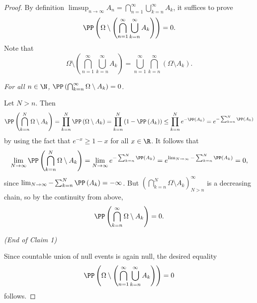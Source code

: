 \documentclass[stat901]{subfiles}
\begin{document}
    \begin{proof}
        By definition $\limsup_{n\to\infty}A_n = \bigcap^{\infty}_{n=1}\bigcup^{\infty}_{k=n}A_k$, it suffices to prove
        \begin{equation*}
            \PP\left( \Omega\setminus \left( \bigcap^{\infty}_{n=1}\bigcup^{\infty}_{k=n}A_k \right) \right) = 0.
        \end{equation*}
        Note that 
        \begin{equation*}
            \Omega\setminus \left( \bigcap^{\infty}_{n=1}\bigcup^{\infty}_{k=n}A_k \right) = \bigcup^{\infty}_{n=1}\bigcap^{\infty}_{k=n} \left( \Omega\setminus A_k \right).
        \end{equation*}

        \begin{claim}
            \textit{For all $n\in\N$, $\PP\left( \bigcap^{\infty}_{k=n} \Omega\setminus A_k \right) = 0$.}

            Let $N>n$. Then
            \begin{equation*}
                \PP\left( \bigcap^{N}_{k=n}\Omega\setminus A_k \right) = \prod^{N}_{k=n}\PP\left( \Omega\setminus A_k \right) = \prod^{N}_{k=n} \left( 1-\PP\left( A_k \right) \right) \leq \prod^{N}_{k=n} e^{-\PP\left( A_k \right)} = e^{-\sum^{N}_{k=n}\PP\left( A_k \right)}
            \end{equation*}
            by using the fact that $e^{-x}\geq 1-x$ for all $x\in\R$. It follows that
            \begin{equation*}
                \lim_{N\to\infty} \PP\left( \bigcap^{N}_{k=n} \Omega\setminus A_k \right) = \lim_{N\to\infty} e^{-\sum^{N}_{k=n}\PP\left( A_k \right)} = e^{\lim_{N\to\infty}-\sum^{N}_{k=n}\PP\left( A_k \right)} = 0,
            \end{equation*}
            since $\lim_{N\to\infty}-\sum^{N}_{k=n}\PP\left( A_k \right)=-\infty$. But $\left( \bigcap^{N}_{k=n}\Omega\setminus A_k \right)^{\infty}_{N>n}$ is a decreasing chain, so by the continuity from above,
            \begin{equation*}
                \PP\left( \bigcap^{\infty}_{k=n}\Omega\setminus A_k \right) =0.
            \end{equation*}

            \hfill\textit{(End of Claim 1)}
        \end{claim}

        Since countable union of null events is again null, the desired equality
        \begin{equation*}
            \PP\left( \Omega\setminus \left( \bigcap^{\infty}_{n=1}\bigcup^{\infty}_{k=n}A_k \right) \right) = 0
        \end{equation*}
        follows.
    \end{proof}
        
\end{document}
